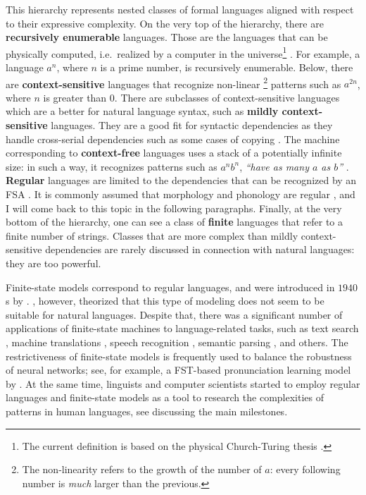This hierarchy represents nested classes of formal languages aligned with respect to their expressive complexity.
On the very top of the hierarchy, there are \textbf{recursively enumerable} languages.
Those are the languages that can be physically computed, i.e.\ realized by a computer in the universe\footnote{The current definition is based on the physical Church-Turing thesis \citep{Church1936,Turing1937a,Turing1937b}.} \citep{Chomsky1956}.
For example, a language $a^{n}$, where $n$ is a prime number, is recursively enumerable.
Below, there are \textbf{context-sensitive} languages that recognize non-linear%
\footnote{The non-linearity refers to the growth of the number of $a$: every following number is \emph{much} larger than the previous.}
 patterns such as $a^{2n}$, where $n$ is greater than $0$.
There are subclasses of context-sensitive languages which are a better for natural language syntax, such as \textbf{mildly context-sensitive} languages.
They are a good fit for syntactic dependencies as they handle cross-serial dependencies such as some cases of copying \citep{Joshi1985,Shieber1985,Kallmeyer2010}.
The machine corresponding to \textbf{context-free} languages uses a stack of a potentially infinite size: in such a way, it recognizes patterns such as $a^{n}b^{n}$, \emph{``have as many $a$ as $b$''} \citep{HopcroftEtAl2006}.
\textbf{Regular} languages are limited to the dependencies that can be recognized by an FSA \citep{HopcroftEtAl2006}.
It is commonly assumed that morphology and phonology are regular \citep{Johnson1972,KaplanKay94,BeesleyKartunnen03,RoarkSproat2007}, and I will come back to this topic in the following paragraphs.
Finally, at the very bottom of the hierarchy, one can see a class of \textbf{finite} languages that refer to a finite number of strings.
Classes that are more complex than mildly context-sensitive dependencies are rarely discussed in connection with natural languages: they are too powerful.

Finite-state models correspond to regular languages, and were introduced in $1940$s by \citeauthor{McCullochPitts1943}.
\cite{Chomsky1956}, however, theorized that this type of modeling does not seem to be suitable for natural languages.
Despite that, there was a significant number of applications of finite-state machines to language-related tasks, such as text search \citep{Thompson1968}, machine translations \citep{OncinaEtAl1994,KnightAlOnaizan1998,BangaloreRiccardi2002}, speech recognition \citep{Caseiro2003,MohriPereiraRiley2002,MohriPereiraRiley2008}, semantic parsing \citep{JonesJohnsonGoldwater2011,JonesJohnsonGoldwater2012}, and others.
The restrictiveness of finite-state models is frequently used to balance the robustness of neural networks; see, for example, a FST-based pronunciation learning model by \cite{Bruguier2017PronunciationLW}. 
At the same time, linguists and computer scientists started to employ regular languages and finite-state models as a tool to research the complexities of patterns in human languages, see \cite{Hulden2014} discussing the main milestones.



